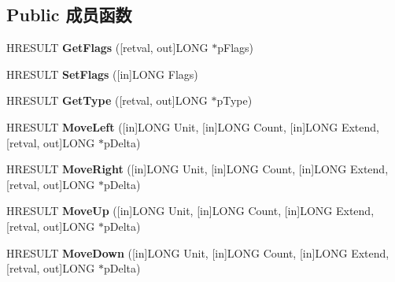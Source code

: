 \subsection*{Public 成员函数}
\begin{DoxyCompactItemize}
\item 
\mbox{\label{interface_i_text_selection_ac6841ee50addd6a6f29189c0c1982b1b}} 
H\+R\+E\+S\+U\+LT {\bfseries Get\+Flags} (\mbox{[}retval, out\mbox{]}L\+O\+NG $\ast$p\+Flags)
\item 
\mbox{\label{interface_i_text_selection_a70a5d109945b2d57711fb8ca2e1967ca}} 
H\+R\+E\+S\+U\+LT {\bfseries Set\+Flags} (\mbox{[}in\mbox{]}L\+O\+NG Flags)
\item 
\mbox{\label{interface_i_text_selection_ac1106cdc12124394b3175275e23627e4}} 
H\+R\+E\+S\+U\+LT {\bfseries Get\+Type} (\mbox{[}retval, out\mbox{]}L\+O\+NG $\ast$p\+Type)
\item 
\mbox{\label{interface_i_text_selection_a2153d4aa8100fc4bbc9bfe3d907dfed5}} 
H\+R\+E\+S\+U\+LT {\bfseries Move\+Left} (\mbox{[}in\mbox{]}L\+O\+NG Unit, \mbox{[}in\mbox{]}L\+O\+NG Count, \mbox{[}in\mbox{]}L\+O\+NG Extend, \mbox{[}retval, out\mbox{]}L\+O\+NG $\ast$p\+Delta)
\item 
\mbox{\label{interface_i_text_selection_ad1ab64be37603553a089fd09ae9aa3b6}} 
H\+R\+E\+S\+U\+LT {\bfseries Move\+Right} (\mbox{[}in\mbox{]}L\+O\+NG Unit, \mbox{[}in\mbox{]}L\+O\+NG Count, \mbox{[}in\mbox{]}L\+O\+NG Extend, \mbox{[}retval, out\mbox{]}L\+O\+NG $\ast$p\+Delta)
\item 
\mbox{\label{interface_i_text_selection_ab24ea10d750d98462737f4ef5ceab67b}} 
H\+R\+E\+S\+U\+LT {\bfseries Move\+Up} (\mbox{[}in\mbox{]}L\+O\+NG Unit, \mbox{[}in\mbox{]}L\+O\+NG Count, \mbox{[}in\mbox{]}L\+O\+NG Extend, \mbox{[}retval, out\mbox{]}L\+O\+NG $\ast$p\+Delta)
\item 
\mbox{\label{interface_i_text_selection_a9e0c4d191ab9abb3e23ee8d53aaee1ad}} 
H\+R\+E\+S\+U\+LT {\bfseries Move\+Down} (\mbox{[}in\mbox{]}L\+O\+NG Unit, \mbox{[}in\mbox{]}L\+O\+NG Count, \mbox{[}in\mbox{]}L\+O\+NG Extend, \mbox{[}retval, out\mbox{]}L\+O\+NG $\ast$p\+Delta)

\end{DoxyCompactItemize}
